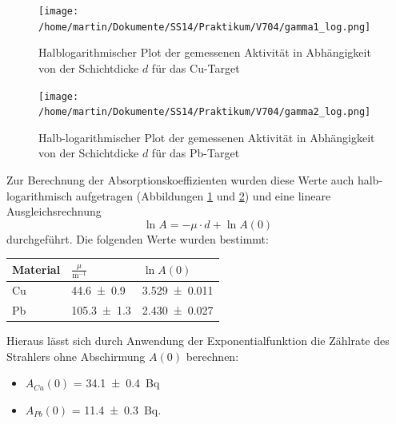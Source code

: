 \documentclass[11pt,ngerman,a4paper]{article}
\begin{document}
\begin{figure}[H]
\centering
\texttt{[image: /home/martin/Dokumente/SS14/Praktikum/V704/gamma1\_log.png]}
\caption{Halblogarithmischer Plot der gemessenen Aktivität in Abhängigkeit von der Schichtdicke $d$ für das Cu-Target}
\label{abb_gamma1_log}
\end{figure}
\begin{figure}[H]
\centering
\texttt{[image: /home/martin/Dokumente/SS14/Praktikum/V704/gamma2\_log.png]}
\caption{Halb-logarithmischer Plot der gemessenen Aktivität in Abhängigkeit von der Schichtdicke $d$ für das Pb-Target}
\label{abb_gamma2_log}
\end{figure}
\noindent
Zur Berechnung der Absorptionskoeffizienten wurden diese Werte auch halb-logarithmisch aufgetragen (Abbildungen \ref{abb_gamma1_log}  und \ref{abb_gamma2_log}) und eine lineare Ausgleichsrechnung 
\[
\ln{A} = -\mu \cdot d + \ln{A(0)}
\]
durchgeführt. Die folgenden Werte wurden bestimmt:
\begin{table}[h]
\centering
\begin{tabular}{lll}

\toprule
	Material & $\frac{\mu}{\si{\meter^{-1}}} $& $\ln{A(0)}$ \\
 \midrule 
 	Cu & \num{44.6+-0.9} & \num{3.529+-0.011}\\
	Pb & \num{105.3+-1.3 }  & \num{2.430+-0.027}\\

\bottomrule
\end{tabular}
\end{table}

\noindent
Hieraus lässt sich durch Anwendung der Exponentialfunktion die Zählrate des Strahlers ohne Abschirmung $A(0)$ berechnen:
\begin{itemize}
\item $A_{Cu}(0)$ = \SI{34.1+-0.4}{\becquerel}
\item $A_{Pb}(0)$ = \SI{11.4+-0.3 }{\becquerel}.

\end{itemize}
\end{document}
